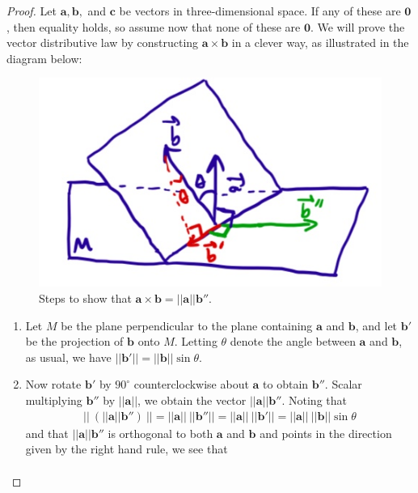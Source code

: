 \documentclass[12pt,letterpaper,reqno]{article}
\numberwithin{equation}{section}
\begin{document}
\begin{proof}
	Let $\mathbf{a}, \mathbf{b},$ and $\mathbf{c}$ be vectors in three-dimensional space. If any of these are $\mathbf{0}$, then equality holds, so assume now that none of these are $\mathbf{0}$. We will prove the vector distributive law by constructing $\mathbf{a} \times \mathbf{b}$ in a clever way, as illustrated in the diagram below:
	\begin{figure}[h]
		\begin{center}
			\includegraphics[scale=0.5]{figures_mvc/cp_vector_dist_prop}
		\end{center}
		\caption{Steps to show that $\mathbf{a} \times \mathbf{b}=||\mathbf{a}||\mathbf{b}''$.}
	\end{figure}
	\begin{enumerate}[(1)]
		\item Let $M$ be the plane perpendicular to the plane containing $\mathbf{a}$ and $\mathbf{b}$, and let $\mathbf{b}'$ be the projection of $\mathbf{b}$ onto $M$. Letting $\theta$ denote the angle between $\mathbf{a}$ and $\mathbf{b}$, as usual, we have $||\mathbf{b}'||=||\mathbf{b}||\sin\theta$.
		\item Now rotate $\mathbf{b}'$ by $90^\circ$ counterclockwise about $\mathbf{a}$ to obtain $\mathbf{b}''$. Scalar multiplying $\mathbf{b}''$ by $||\mathbf{a}||$, we obtain the vector $||\mathbf{a}||\mathbf{b}''$. Noting that
		\begin{align*}
			||\ (||\mathbf{a}|| \mathbf{b}'') \ ||=||\mathbf{a}|| \ ||\mathbf{b}''|| = ||\mathbf{a}|| \ ||\mathbf{b}'||=||\mathbf{a}|| \ ||\mathbf{b}||\sin \theta
		\end{align*}
		and that $||\mathbf{a}||\mathbf{b}''$ is orthogonal to both $\mathbf{a}$ and $\mathbf{b}$ and points in the direction given by the right hand rule, we see that 
		\begin{align}\label{eq:clever_b}

\end{align}
\end{enumerate}
\end{proof}
\end{document}
